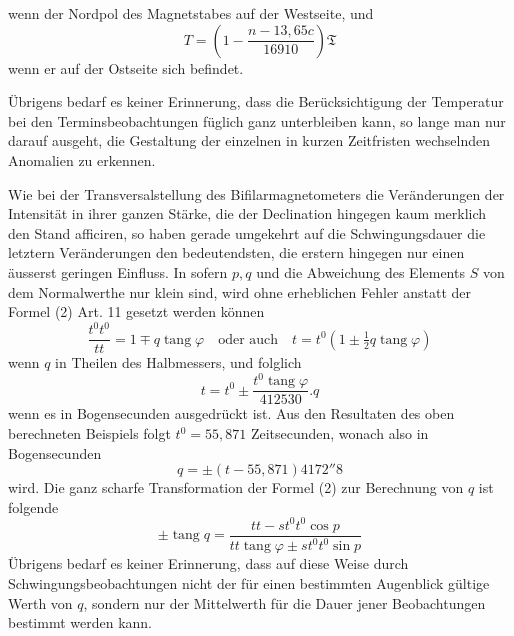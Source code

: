 \par\clearpage
{}
\noindent wenn der Nordpol des Magnetstabes auf der Westseite, und
\[
T=(1-\frac{n-13{,}65c}{16910})\mathfrak{T}
\]
wenn er auf der Ostseite sich befindet.

Übrigens bedarf es keiner Erinnerung, dass die Berücksichtigung der Temperatur bei den Terminsbeobachtungen füglich ganz unterbleiben kann, so lange man nur darauf ausgeht, die Gestaltung der einzelnen in kurzen Zeitfristen wechselnden Anomalien zu erkennen.

Wie bei der Transversalstellung des Bifilarmagnetometers die Veränderungen der Intensität in ihrer ganzen Stärke, die der Declination hingegen kaum merklich den Stand afficiren, so haben gerade umgekehrt auf die Schwingungsdauer die letztern Veränderungen den bedeutendsten, die erstern hingegen nur einen äusserst geringen Einfluss. In sofern $p,q$ und die Abweichung des Elements $S$ von dem Normalwerthe nur klein sind, wird ohne erheblichen Fehler anstatt der Formel (2) Art. 11 gesetzt werden können
\[
\frac{t^0t^0}{tt}=1\mp q\operatorname{tang}\varphi\quad\text{oder auch}\quad t=t^0(1\pm\tfrac12q\operatorname{tang}\varphi)
\]
wenn $q$ in Theilen des Halbmessers, und folglich
\[
t=t^0\pm\frac{t^0\operatorname{tang}\varphi}{412530}.q
\]
wenn es in Bogensecunden ausgedrückt ist. Aus den Resultaten des oben berechneten Beispiels folgt $t^0=55{,}871$ Zeitsecunden, wonach also in Bogensecunden
\[
q=\pm(t-55{,}871)4172''8
\]
wird. Die ganz scharfe Transformation der Formel (2) zur Berechnung von $q$ ist folgende
\[
\pm\operatorname{tang}q=\frac{tt-st^0t^0\cos p}{tt\operatorname{tang}\varphi\pm st^0t^0\sin p}
\]
Übrigens bedarf es keiner Erinnerung, dass auf diese Weise durch Schwin\-gungsbeobachtungen nicht der für einen bestimmten Augenblick gültige Werth von $q$, sondern nur der Mittelwerth für die Dauer jener Beobachtungen bestimmt werden kann.

